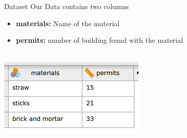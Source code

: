 \documentclass[8pt]{beamer}
\begin{document}
        \begin{frame}[t]{Dataset}
            Our Data contains two columns
            \begin{itemize}
                \item \textbf{materials:} Name of the material
                \item \textbf{permits:} number of building found with the material
            \end{itemize}\\[1.5cm]
            \centering
            \includegraphics[height=.25\textheight]{images/data.png}
        \end{frame}
\end{document}
